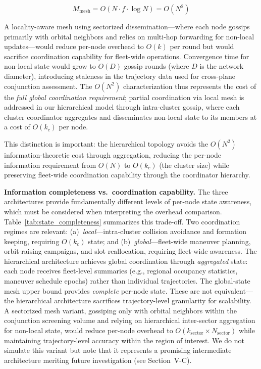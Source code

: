 \documentclass[journal]{IEEEtran}
\begin{document}
\begin{equation}
    M_{\text{mesh}} = O(N \cdot f \cdot \log N) = O(N^2)
    \label{eq:mesh_messages}
\end{equation}

A locality-aware mesh using sectorized dissemination---where each node gossips primarily with orbital neighbors and relies on multi-hop forwarding for non-local updates---would reduce per-node overhead to $O(k)$ per round but would sacrifice coordination capability for fleet-wide operations. Convergence time for non-local state would grow to $O(D)$ gossip rounds (where $D$ is the network diameter), introducing staleness in the trajectory data used for cross-plane conjunction assessment. The $O(N^2)$ characterization thus represents the cost of the \emph{full global coordination requirement}; partial coordination via local mesh is addressed in our hierarchical model through intra-cluster gossip, where each cluster coordinator aggregates and disseminates non-local state to its members at a cost of $O(k_c)$ per node.

This distinction is important: the hierarchical topology avoids the $O(N^2)$ information-theoretic cost through aggregation, reducing the per-node information requirement from $O(N)$ to $O(k_c)$ (the cluster size) while preserving fleet-wide coordination capability through the coordinator hierarchy.

\textbf{Information completeness vs.\ coordination capability.} The three architectures provide fundamentally different levels of per-node state awareness, which must be considered when interpreting the overhead comparison. Table~\ref{tab:state_completeness} summarizes this trade-off. Two coordination regimes are relevant: (a)~\emph{local}---intra-cluster collision avoidance and formation keeping, requiring $O(k_c)$ state; and (b)~\emph{global}---fleet-wide maneuver planning, orbit-raising campaigns, and slot reallocation, requiring fleet-wide awareness. The hierarchical architecture achieves global coordination through \emph{aggregated} state: each node receives fleet-level summaries (e.g., regional occupancy statistics, maneuver schedule epochs) rather than individual trajectories. The global-state mesh upper bound provides \emph{complete} per-node state. These are not equivalent---the hierarchical architecture sacrifices trajectory-level granularity for scalability. A sectorized mesh variant, gossiping only with orbital neighbors within the conjunction screening volume and relying on hierarchical inter-sector aggregation for non-local state, would reduce per-node overhead to $O(k_{\text{sector}} \times N_{\text{sector}})$ while maintaining trajectory-level accuracy within the region of interest. We do not simulate this variant but note that it represents a promising intermediate architecture meriting future investigation (see Section~V-C).
\end{document}
